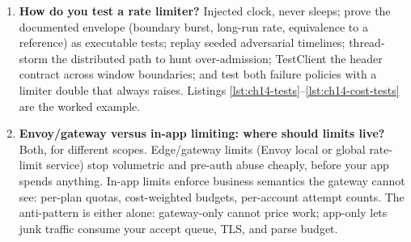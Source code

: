\begin{enumerate}[label=\textbf{Q\arabic*.}, leftmargin=1.6cm, start=21]
        \texttt{Retry-After} means ``everyone, come back later.'' Shedding
        needs a priority order decided in advance (critical $>$ interactive
        $>$ batch), must shed cheaply (before parsing bodies), and must
        never conflate the two statuses or clients' backoff logic misfires.
  \item \textbf{How do you test a rate limiter?}
        Injected clock, never sleeps; prove the documented envelope
        (boundary burst, long-run rate, equivalence to a reference) as
        executable tests; replay seeded adversarial timelines; thread-storm
        the distributed path to hunt over-admission; TestClient the header
        contract across window boundaries; and test both failure policies
        with a limiter double that always raises. Listings
        \ref{lst:ch14-tests}--\ref{lst:ch14-cost-tests} are the worked
        example.
  \item \textbf{Envoy/gateway versus in-app limiting: where should limits
        live?}
        Both, for different scopes. Edge/gateway limits (Envoy local or
        global rate-limit service) stop volumetric and pre-auth abuse
        cheaply, before your app spends anything. In-app limits enforce
        business semantics the gateway cannot see: per-plan quotas,
        cost-weighted budgets, per-account attempt counts. The anti-pattern
        is either alone: gateway-only cannot price work; app-only lets
        junk traffic consume your accept queue, TLS, and parse budget.
\end{enumerate}

